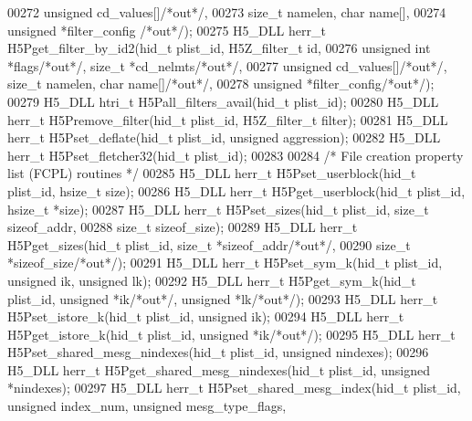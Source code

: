 \begin{DoxyCode}
00272        \textcolor{keywordtype}{unsigned} cd\_values[]\textcolor{comment}{/*out*/},
00273        \textcolor{keywordtype}{size\_t} namelen, \textcolor{keywordtype}{char} name[],
00274        \textcolor{keywordtype}{unsigned} *filter\_config \textcolor{comment}{/*out*/});
00275 H5\_DLL herr\_t H5Pget\_filter\_by\_id2(hid\_t plist\_id, H5Z\_filter\_t \textcolor{keywordtype}{id},
00276        \textcolor{keywordtype}{unsigned} \textcolor{keywordtype}{int} *flags\textcolor{comment}{/*out*/}, \textcolor{keywordtype}{size\_t} *cd\_nelmts\textcolor{comment}{/*out*/},
00277        \textcolor{keywordtype}{unsigned} cd\_values[]\textcolor{comment}{/*out*/}, \textcolor{keywordtype}{size\_t} namelen, \textcolor{keywordtype}{char} name[]\textcolor{comment}{/*out*/},
00278        \textcolor{keywordtype}{unsigned} *filter\_config\textcolor{comment}{/*out*/});
00279 H5\_DLL htri\_t H5Pall\_filters\_avail(hid\_t plist\_id);
00280 H5\_DLL herr\_t H5Premove\_filter(hid\_t plist\_id, H5Z\_filter\_t filter);
00281 H5\_DLL herr\_t H5Pset\_deflate(hid\_t plist\_id, \textcolor{keywordtype}{unsigned} aggression);
00282 H5\_DLL herr\_t H5Pset\_fletcher32(hid\_t plist\_id);
00283 
00284 \textcolor{comment}{/* File creation property list (FCPL) routines */}
00285 H5\_DLL herr\_t H5Pset\_userblock(hid\_t plist\_id, hsize\_t size);
00286 H5\_DLL herr\_t H5Pget\_userblock(hid\_t plist\_id, hsize\_t *size);
00287 H5\_DLL herr\_t H5Pset\_sizes(hid\_t plist\_id, \textcolor{keywordtype}{size\_t} sizeof\_addr,
00288        \textcolor{keywordtype}{size\_t} sizeof\_size);
00289 H5\_DLL herr\_t H5Pget\_sizes(hid\_t plist\_id, \textcolor{keywordtype}{size\_t} *sizeof\_addr\textcolor{comment}{/*out*/},
00290        \textcolor{keywordtype}{size\_t} *sizeof\_size\textcolor{comment}{/*out*/});
00291 H5\_DLL herr\_t H5Pset\_sym\_k(hid\_t plist\_id, \textcolor{keywordtype}{unsigned} ik, \textcolor{keywordtype}{unsigned} lk);
00292 H5\_DLL herr\_t H5Pget\_sym\_k(hid\_t plist\_id, \textcolor{keywordtype}{unsigned} *ik\textcolor{comment}{/*out*/}, \textcolor{keywordtype}{unsigned} *lk\textcolor{comment}{/*out*/});
00293 H5\_DLL herr\_t H5Pset\_istore\_k(hid\_t plist\_id, \textcolor{keywordtype}{unsigned} ik);
00294 H5\_DLL herr\_t H5Pget\_istore\_k(hid\_t plist\_id, \textcolor{keywordtype}{unsigned} *ik\textcolor{comment}{/*out*/});
00295 H5\_DLL herr\_t H5Pset\_shared\_mesg\_nindexes(hid\_t plist\_id, \textcolor{keywordtype}{unsigned} nindexes);
00296 H5\_DLL herr\_t H5Pget\_shared\_mesg\_nindexes(hid\_t plist\_id, \textcolor{keywordtype}{unsigned} *nindexes);
00297 H5\_DLL herr\_t H5Pset\_shared\_mesg\_index(hid\_t plist\_id, \textcolor{keywordtype}{unsigned} index\_num, \textcolor{keywordtype}{unsigned} mesg\_type\_flags, \textcolor{keywordtype}{
}
\end{DoxyCode}
